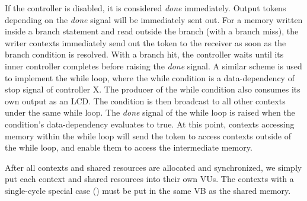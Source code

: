 If the controller is disabled, it is considered {\em done} immediately.
Output tokens depending on the {\em done} signal will be immediately sent out.
For a memory written inside a branch statement and read outside the branch (with a branch miss), the
writer contexts immediately send out the token to the receiver
as soon as the branch condition is resolved. 
With a branch hit, the controller waits until its inner controller completes before raising the {\em done} signal.
A similar scheme is used to implement the while loop, where the while condition is a data-dependency of stop signal of controller X. 
The producer of the while condition also consumes its own output as an LCD. 
The condition is then broadcast to all other contexts under the same while loop. 
The {\em done} signal of the while loop is raised when the condition's data-dependency evaluates to true.
At this point, contexts accessing memory within the while loop will send the token to access contexts outside of the while loop, and enable them to access the intermediate memory.

After all contexts and shared resources are allocated and synchronized, we simply put each context and shared resources into their own VUs.
The contexts with a single-cycle special case () must be put in the same VB as the shared memory.
